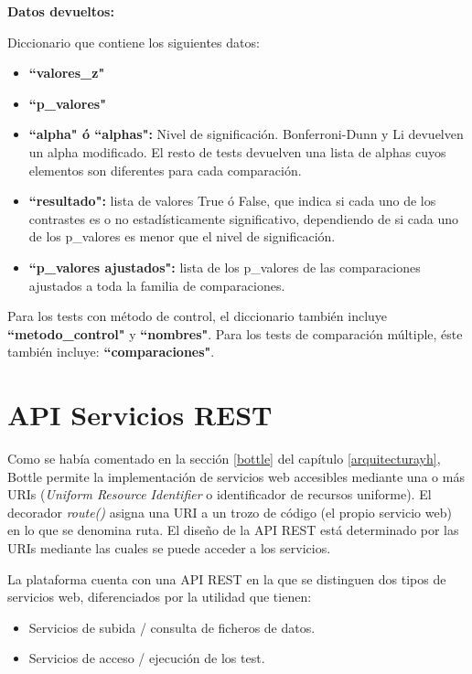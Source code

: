 \noindent
\textbf{Datos devueltos:}

Diccionario que contiene los siguientes datos:                                              

\begin{itemize}
\item \textbf{``valores\_z"}
\item \textbf{``p\_valores"}
\item \textbf{``alpha" \space ó ``alphas":} Nivel de significación. Bonferroni-Dunn y Li devuelven un alpha modificado. El resto de tests devuelven una lista de alphas cuyos elementos son diferentes para cada comparación.
\item \textbf{``resultado":} lista de valores True ó False, que indica si cada uno de los contrastes es o no estadísticamente significativo, dependiendo de si cada uno de los p\_valores es menor que el nivel de significación.
\item \textbf{``p\_valores ajustados":} lista de los p\_valores de las comparaciones ajustados a toda la familia de comparaciones.
\end{itemize}

Para los tests con método de control, el diccionario también incluye \textbf{``metodo\_control"} y \textbf{``nombres"}. Para los tests de comparación múltiple, éste también incluye: \textbf{``comparaciones"}.

\section{API Servicios REST}
Como se había comentado en la sección \ref{bottle} del capítulo \ref{arquitecturayh}, Bottle permite la implementación de servicios web accesibles mediante una o más URIs (\textit{Uniform Resource Identifier} o identificador de recursos uniforme). El decorador \textit{route()} asigna una URI a un trozo de código (el propio servicio web) en lo que se denomina ruta. El diseño de la API REST está determinado por las URIs mediante las cuales se puede acceder a los servicios.

La plataforma cuenta con una API REST en la que se distinguen dos tipos de servicios web, diferenciados por la utilidad que tienen:
\begin{itemize}
\item Servicios de subida / consulta de ficheros de datos.
\item Servicios de acceso / ejecución de los test.
\end{itemize}

